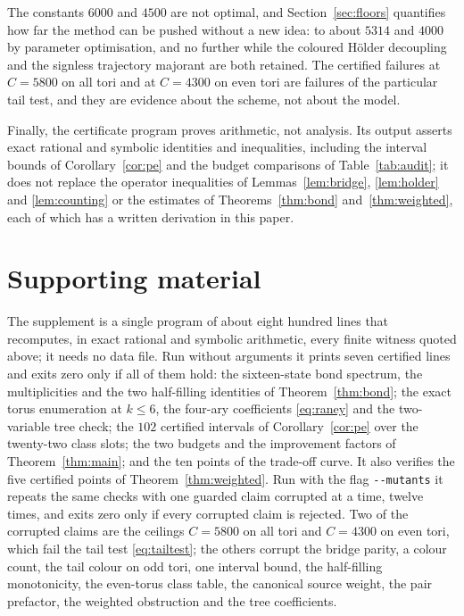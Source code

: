 \documentclass[11pt]{article}
\theoremstyle{plain}
\theoremstyle{definition}
\begin{document}
The constants $6000$ and $4500$ are not optimal, and Section~\ref{sec:floors}
quantifies how far the method can be pushed without a new idea: to about $5314$ and
$4000$ by parameter optimisation, and no further while the coloured H\"older
decoupling and the signless trajectory majorant are both retained. The certified
failures at $C=5800$ on all tori and at $C=4300$ on even tori are failures of the
particular tail test, and they are evidence about the scheme, not about the model.

Finally, the certificate program proves arithmetic, not analysis. Its output asserts
exact rational and symbolic identities and inequalities, including the interval
bounds of Corollary~\ref{cor:pe} and the budget comparisons of
Table~\ref{tab:audit}; it does not replace the operator inequalities of
Lemmas~\ref{lem:bridge}, \ref{lem:holder} and \ref{lem:counting} or the estimates of
Theorems~\ref{thm:bond} and~\ref{thm:weighted}, each of which has a written
derivation in this paper.

\section{Supporting material}\label{sec:supplement}

The supplement is a single program of about eight hundred lines that recomputes, in
exact rational and symbolic arithmetic, every finite witness quoted above; it needs
no data file. Run without arguments it prints seven certified lines and exits
zero only if all of them hold: the sixteen-state bond spectrum, the multiplicities
and the two half-filling identities of Theorem~\ref{thm:bond}; the exact torus
enumeration at $k\le6$, the four-ary coefficients \eqref{eq:raney} and the
two-variable tree check; the $102$ certified intervals of Corollary~\ref{cor:pe}
over the twenty-two class slots; the two budgets and the improvement factors of
Theorem~\ref{thm:main}; and the ten points of the trade-off curve. It also verifies
the five certified points of Theorem~\ref{thm:weighted}. Run with the flag
\verb|--mutants| it repeats the same checks with one guarded claim corrupted at a
time, twelve times, and exits zero only if every corrupted claim is rejected. Two of
the corrupted claims are the ceilings $C=5800$ on all tori and $C=4300$ on even
tori, which fail the tail test \eqref{eq:tailtest}; the others corrupt the bridge
parity, a colour count, the tail colour on odd tori, one interval bound, the
half-filling monotonicity, the even-torus class table, the canonical source weight,
the pair prefactor, the weighted obstruction and the tree coefficients.
\end{document}
